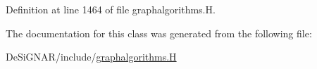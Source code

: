 Definition at line 1464 of file graphalgorithms.\+H.



The documentation for this class was generated from the following file\+:\begin{DoxyCompactItemize}
\item 
De\+Si\+G\+N\+A\+R/include/\hyperlink{graphalgorithms_8_h}{graphalgorithms.\+H}\end{DoxyCompactItemize}
